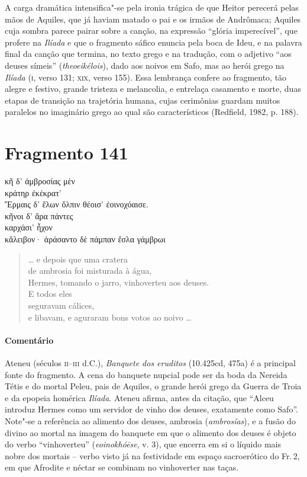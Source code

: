 {A carga dramática intensifica"-se pela ironia trágica de que Heitor perecerá
pelas mãos de Aquiles, que já haviam matado o pai e os irmãos de Andrômaca; Aquiles cuja sombra parece pairar sobre a canção, na expressão ``glória imperecível'', que profere na \textit{Ilíada} e que o fragmento sáfico enuncia pela boca de Ideu, e na palavra final da canção que termina, no texto grego e na tradução, com o adjetivo ``aos deuses símeis'' (\textit{theoeikélois}), dado aos noivos em Safo, mas ao herói grego na \textit{Ilíada} (\textsc{i}, verso 131; \textsc{xix}, verso 155).
Essa lembrança confere ao fragmento, tão alegre e festivo, grande tristeza e
melancolia, e entrelaça casamento e morte, duas etapas de transição na trajetória
humana, cujas cerimônias guardam muitos paralelos no imaginário grego ao qual são característicos (Redfield, 1982, p. 188).}



\pagebreak
\section{Fragmento 141}

\begin{gkverse}
κῆ δ’ ἀμβροσίας μὲν\\
κράτηρ ἐκέκρατ’\\
Ἔρμαις δ’ ἔλων ὄλπιν θέοισ’ ἐοινοχόαισε.\\
κῆνοι δ’ ἄρα πάντες\\
καρχάσι’ ἦχον\\
κἄλειβον· ἀράσαντο δὲ πάμπαν ἔσλα γάμβρωι
\end{gkverse}

\begin{verse}
\ldots{} e depois que uma cratera\\
de ambrosia foi misturada à água,\\
Hermes, tomando o jarro, vinhoverteu aos deuses.\\
E todos eles\\
seguravam cálices,\\
e libavam, e aguraram bons votos ao noivo \ldots{}
\end{verse}

\paragraph{Comentário}
Ateneu (séculos \textsc{ii--iii} d.C.), \textit{Banquete dos eruditos} (10.425cd, 475a) é a principal fonte do fragmento. A cena  do  banquete nupcial pode ser da boda da Nereida Tétis e do mortal Peleu, pais de Aquiles, o grande herói grego da Guerra de Troia e da epopeia homérica \textit{Ilíada}. Ateneu afirma, antes da citação, que “Alceu introduz Hermes como um servidor de vinho dos deuses, exatamente como Safo”. Note"-se a referência ao alimento dos deuses, ambrosia (\textit{ambrosías}), e a fusão do divino ao mortal na imagem do banquete em que o alimento dos deuses é objeto do verbo ``vinhoverteu'' (\textit{eoinokhóēse}, v. 3), que encerra em si o líquido mais nobre dos mortais -- verbo visto já na festividade em espaço sacroerótico do Fr.\,2, em que Afrodite e néctar se combinam no vinhoverter nas taças.


